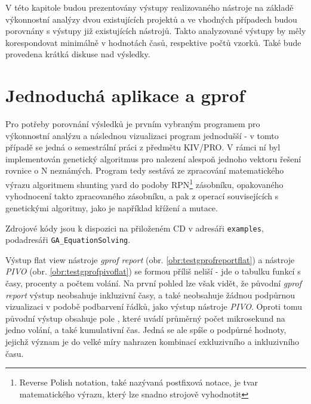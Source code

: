 \documentclass[czech,BP]{thesiskiv}
\begin{document}
V této kapitole budou prezentovány výstupy realizovaného nástroje na základě výkonnostní analýzy dvou existujících projektů a ve vhodných případech budou porovnány s výstupy již existujících nástrojů. Takto analyzované výstupy by měly korespondovat minimálně v hodnotách časů, respektive počtů vzorků. Také bude provedena krátká diskuse nad výsledky.

\section{Jednoduchá aplikace a gprof}\label{sec:overeni1}

Pro potřeby porovnání výsledků je prvním vybraným programem pro výkonnostní analýzu a následnou vizualizaci program jednodušší - v tomto případě se jedná o semestrální práci z předmětu KIV/PRO. V rámci ní byl implementován genetický algoritmus pro nalezení alespoň jednoho vektoru řešení rovnice o N neznámých. Program tedy sestává ze zpracování matematického výrazu algoritmem shunting yard do podoby RPN\footnote{Reverse Polish notation, také nazývaná postfixová notace, je tvar matematického výrazu, který lze snadno strojově vyhodnotit} zásobníku, opakovaného vyhodnocení takto zpracovaného zásobníku, a pak z operací souvisejících s genetickými algoritmy, jako je například křížení a mutace.

Zdrojové kódy jsou k dispozici na přiloženém CD v adresáři \texttt{examples}, podadresáři \texttt{GA\_EquationSolving}.

Výstup flat view nástroje \emph{gprof report} (obr. \ref{obr:testgprofreportflat}) a nástroje \emph{PIVO} (obr. \ref{obr:testgprofpivoflat}) se formou příliš neliší - jde o tabulku funkcí s časy, procenty a počtem volání. Na první pohled lze však vidět, že původní \emph{gprof report} výstup neobsahuje inkluzivní časy, a také neobsahuje žádnou podpůrnou vizualizaci v podobě podbarvení řádků, jako výstup nástroje \emph{PIVO}. Oproti tomu původní výstup obsahuje pole , které uvádí průměrný počet mikrosekund na jedno volání, a také kumulativní čas. Jedná se ale spíše o podpůrné hodnoty, jejichž význam je do velké míry nahrazen kombinací exkluzivního a inkluzivního času.

\newpage
\vspace*{1cm} %
\end{document}
